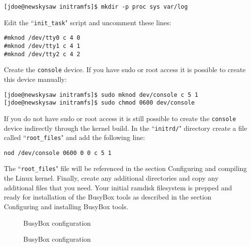 \documentclass{article}[11pt]
\def\colfigsize{\epsfxsize=5in}
\begin{document}
\begin{verbatim}
[jdoe@newskysaw initramfs]$ mkdir -p proc sys var/log
\end{verbatim}

\noindent
Edit the ``\verb|init_task|" script and uncomment these lines:

\begin{verbatim}
#mknod /dev/tty0 c 4 0
#mknod /dev/tty1 c 4 1
#mknod /dev/tty2 c 4 2
\end{verbatim}

\pagebreak

\noindent
Create the \verb|console| device. If you have sudo or root access it is possible
to create this device manually:

\begin{verbatim}
[jdoe@newskysaw initramfs]$ sudo mknod dev/console c 5 1
[jdoe@newskysaw initramfs]$ sudo chmod 0600 dev/console
\end{verbatim}

\noindent
If you do not have sudo or root access it is still possible to create the
\verb|console| device indirectly through the kernel build.  In the
``\verb|initrd/|" directory create a file called ``\verb|root_files|" and add
the following line:

\begin{verbatim}
nod /dev/console 0600 0 0 c 5 1
\end{verbatim}

\noindent
The ``\verb|root_files|" file will be referenced in the section Configuring and
compiling the Linux kernel. Finally, create any additional directories and copy
any additional files that you need. Your initial ramdisk filesystem is prepped
and ready for installation of the BusyBox tools as described in the section
Configuring and installing BusyBox tools.



\pagebreak
\begin{figure}[ht]
  \begin{center}
    \colfigsize{}
    \caption{BusyBox configuration}
    \label{fig:busyboxcf1}
  \end{center}
\end{figure}

\begin{figure}[h]
  \begin{center}
    \colfigsize{}
  \end{center}
  \caption{BusyBox configuration}
  \label{fig:busyboxcf2}
\end{figure}
\end{document}
